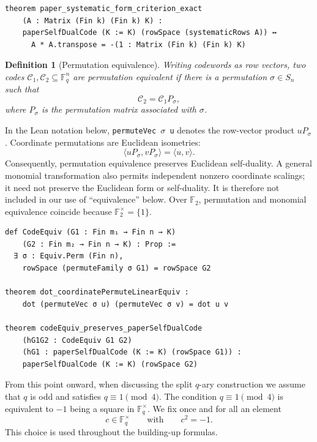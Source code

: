 \documentclass[12pt]{article}
\newtheorem{defn}{Definition}[section]
\newcommand{\F}{\mathbb{F}}
\begin{document}
\begin{lstlisting}[caption={Lean for Proposition~\ref{prop:systematic-form}.}]
theorem paper_systematic_form_criterion_exact
    (A : Matrix (Fin k) (Fin k) K) :
    paperSelfDualCode (K := K) (rowSpace (systematicRows A)) ↔
      A * A.transpose = -(1 : Matrix (Fin k) (Fin k) K)
\end{lstlisting}

\begin{defn}[Permutation equivalence]\label{def:perm-equiv}
{\rm
Writing codewords as row vectors, two codes
$\mathcal C_1,\mathcal C_2\subseteq\F_q^n$ are
\emph{permutation equivalent} if there is a permutation \(\sigma\in S_n\)
such that
\[
 \mathcal C_2=\mathcal C_1P_\sigma,
\]
where \(P_\sigma\) is the permutation matrix associated with \(\sigma\).
}
\end{defn}

In the Lean notation below, \texttt{permuteVec~\(\sigma\)~u} denotes
the row-vector product \(uP_\sigma\).  Coordinate permutations are Euclidean
isometries:
\[
\langle uP_\sigma,vP_\sigma\rangle=\langle u,v\rangle.
\]
Consequently, permutation equivalence preserves Euclidean self-duality.
A general monomial transformation also permits independent nonzero
coordinate scalings; it need not preserve the Euclidean form or
self-duality. It is therefore not included in our use of ``equivalence''
below. Over \(\F_2\), permutation and monomial equivalence coincide because
\(\F_2^\times=\{1\}\).

\begin{lstlisting}[caption={Lean for Definition~\ref{def:perm-equiv}.}]
def CodeEquiv (G1 : Fin m₁ → Fin n → K)
    (G2 : Fin m₂ → Fin n → K) : Prop :=
  ∃ σ : Equiv.Perm (Fin n),
    rowSpace (permuteFamily σ G1) = rowSpace G2

theorem dot_coordinatePermuteLinearEquiv :
    dot (permuteVec σ u) (permuteVec σ v) = dot u v

theorem codeEquiv_preserves_paperSelfDualCode
    (hG1G2 : CodeEquiv G1 G2)
    (hG1 : paperSelfDualCode (K := K) (rowSpace G1)) :
    paperSelfDualCode (K := K) (rowSpace G2)
\end{lstlisting}




From this point onward, when discussing the split \(q\)-ary construction we assume that \(q\) is odd and satisfies \(q \equiv 1 \pmod 4\). The condition \(q \equiv 1 \pmod 4\) is equivalent to $-1$ being a square in $\F_q^\times$. We fix once and for all an element
\[
c \in \F_q^\times \qquad \text{with} \qquad c^2 = -1.
\]
This choice is used throughout the building-up formulas.
\end{document}
